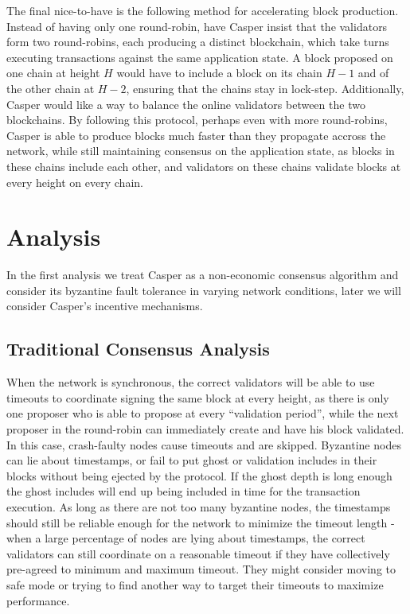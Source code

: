 \documentclass[11pt,a4paper]{article}
\begin{document}
The final nice-to-have is the following method for accelerating block production. Instead of having only one round-robin, have Casper insist that the validators form two round-robins, each producing a distinct blockchain, which take turns executing transactions against the same application state. A block proposed on one chain at height $H$ would have to include a block on its chain $H-1$ and of the other chain at $H-2$, ensuring that the chains stay in lock-step. Additionally, Casper would like a way to balance the online validators between the two blockchains. By following this protocol, perhaps even with more round-robins, Casper is able to produce blocks much faster than they propagate accross the network, while still maintaining consensus on the application state, as blocks in these chains include each other, and validators on these chains validate blocks at every height on every chain. 

\section{Analysis}

In the first analysis we treat Casper as a non-economic consensus algorithm and consider its byzantine fault tolerance in varying network conditions, later we will consider Casper's incentive mechanisms. 

\subsection{Traditional Consensus Analysis}

When the network is synchronous, the correct validators will be able to use timeouts to coordinate signing the same block at every height, as there is only one proposer who is able to propose at every ``validation period'', while the next proposer in the round-robin can immediately create and have his block validated. In this case, crash-faulty nodes cause timeouts and are skipped. Byzantine nodes can lie about timestamps, or fail to put ghost or validation includes in their blocks without being ejected by the protocol. If the ghost depth is long enough the ghost includes will end up being included in time for the transaction execution. As long as there are not too many byzantine nodes, the timestamps should still be reliable enough for the network to minimize the timeout length - when a large percentage of nodes are lying about timestamps, the correct validators can still coordinate on a reasonable timeout if they have collectively pre-agreed to minimum and maximum timeout. They might consider moving to safe mode or trying to find another way to target their timeouts to maximize performance. 
\end{document}

